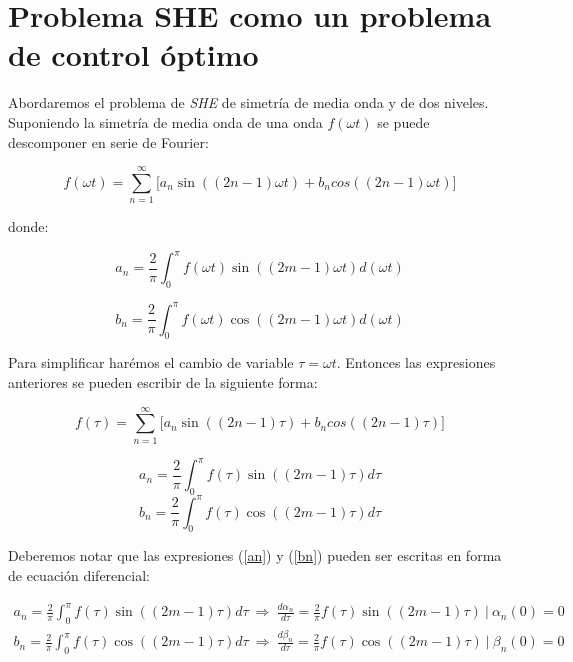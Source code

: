  
\chapter{Problema SHE como un problema de control óptimo}


Abordaremos el problema de \emph{SHE} de simetría de media onda y de dos niveles. Suponiendo la simetría de media onda de una onda $f(\omega t)$ se puede descomponer en serie de Fourier:

\begin{equation}
    f(\omega t) = \sum_{n=1}^{\infty} \Bigg[ a_n \sin((2n-1)\omega t) + b_n cos((2n-1)\omega t)\Bigg]
\end{equation}

donde:

\begin{equation}
    a_n = \frac{2}{\pi} \int_0^\pi f(\omega t) \sin((2m-1) \omega t) d(\omega t) 
\end{equation}

\begin{equation}
    b_n = \frac{2}{\pi} \int_0^\pi f(\omega t) \cos((2m-1) \omega t) d(\omega t) 
\end{equation}

Para simplificar harémos el cambio de variable $\tau = \omega t$. Entonces las expresiones anteriores se pueden escribir de la siguiente forma:

\begin{equation}
    f(\tau) = \sum_{n=1}^{\infty} \Bigg[ a_n \sin((2n-1)\tau) + b_n cos((2n-1)\tau)\Bigg]
\end{equation}

\begin{equation}\label{an}
    a_n = \frac{2}{\pi} \int_0^\pi f(\tau) \sin((2m-1) \tau) d\tau 
\end{equation}
\begin{equation}\label{bn}
    b_n = \frac{2}{\pi} \int_0^\pi f(\tau) \cos((2m-1) \tau) d\tau 
\end{equation}

Deberemos notar que las expresiones (\ref{an}) y (\ref{bn}) pueden ser escritas en forma de ecuación diferencial:

\begin{gather}
    a_n = \frac{2}{\pi} \int_0^\pi f(\tau) \sin((2m-1) \tau) d\tau  \  \Rightarrow \ \frac{d \alpha_n}{d\tau} = \frac{2}{\pi}f(\tau) \sin((2m-1)\tau) \ | \ \alpha_n(0) = 0\\ 
    b_n = \frac{2}{\pi} \int_0^\pi f(\tau) \cos((2m-1) \tau) d\tau  \  \Rightarrow \ \frac{d \beta_n}{d\tau} = \frac{2}{\pi}f(\tau) \cos((2m-1)\tau) \ | \ \beta_n(0) = 0
\end{gather}

